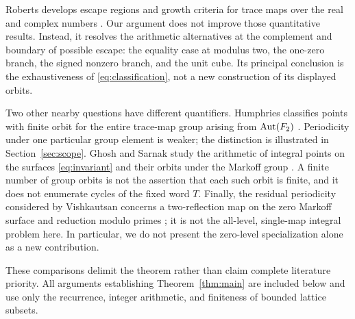 Roberts develops escape regions and growth criteria for trace maps over
the real and complex numbers \citep[\S\S4--5]{roberts1996escaping}.
Our argument does not improve those quantitative results. Instead, it
resolves the arithmetic alternatives at the complement and boundary of
possible escape: the equality case at modulus two, the one-zero branch,
the signed nonzero branch, and the unit cube. Its principal conclusion is
the exhaustiveness of \eqref{eq:classification}, not a new construction
of its displayed orbits.

Two other nearby questions have different quantifiers. Humphries
classifies points with finite orbit for the entire trace-map group
arising from $\operatorname{Aut}(F_2)$ \citep[Theorem~1]{humphries2016finite}.
Periodicity under one particular group element is weaker; the distinction
is illustrated in Section~\ref{sec:scope}. Ghosh and Sarnak study the
arithmetic of integral points on the surfaces \eqref{eq:invariant}
and their orbits under the Markoff group \citep{ghosh2022integral}.
A finite number of group orbits is not the assertion that each such
orbit is finite, and it does not enumerate cycles of the fixed word $T$.
Finally, the residual periodicity considered by Vishkautsan concerns a
two-reflection map on the zero Markoff surface and reduction modulo
primes \citep[\S\S1.1--1.2]{vishkautsan2016residual}; it is not the
all-level, single-map integral problem here. In particular, we do not
present the zero-level specialization alone as a new contribution.

These comparisons delimit the theorem rather than claim complete
literature priority. All arguments establishing
Theorem~\ref{thm:main} are included below and use only the recurrence,
integer arithmetic, and finiteness of bounded lattice subsets.
